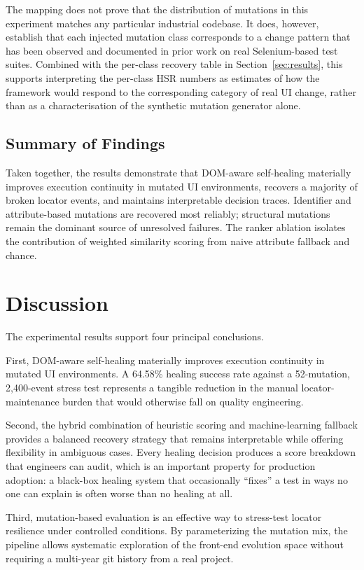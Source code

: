 \documentclass[conference]{IEEEtran}
\begin{document}


The mapping does not prove that the distribution of mutations in this experiment matches any particular industrial codebase. It does, however, establish that each injected mutation class corresponds to a change pattern that has been observed and documented in prior work on real Selenium-based test suites. Combined with the per-class recovery table in Section~\ref{sec:results}, this supports interpreting the per-class HSR numbers as estimates of how the framework would respond to the corresponding category of real UI change, rather than as a characterisation of the synthetic mutation generator alone.

\subsection{Summary of Findings}
Taken together, the results demonstrate that DOM-aware self-healing materially improves execution continuity in mutated UI environments, recovers a majority of broken locator events, and maintains interpretable decision traces. Identifier and attribute-based mutations are recovered most reliably; structural mutations remain the dominant source of unresolved failures. The ranker ablation isolates the contribution of weighted similarity scoring from naive attribute fallback and chance.

\section{Discussion}
\label{sec:discussion}
The experimental results support four principal conclusions.

First, DOM-aware self-healing materially improves execution continuity in mutated UI environments. A 64.58\% healing success rate against a 52-mutation, 2{,}400-event stress test represents a tangible reduction in the manual locator-maintenance burden that would otherwise fall on quality engineering.

Second, the hybrid combination of heuristic scoring and machine-learning fallback provides a balanced recovery strategy that remains interpretable while offering flexibility in ambiguous cases. Every healing decision produces a score breakdown that engineers can audit, which is an important property for production adoption: a black-box healing system that occasionally ``fixes'' a test in ways no one can explain is often worse than no healing at all.

Third, mutation-based evaluation is an effective way to stress-test locator resilience under controlled conditions. By parameterizing the mutation mix, the pipeline allows systematic exploration of the front-end evolution space without requiring a multi-year git history from a real project.
\end{document}
